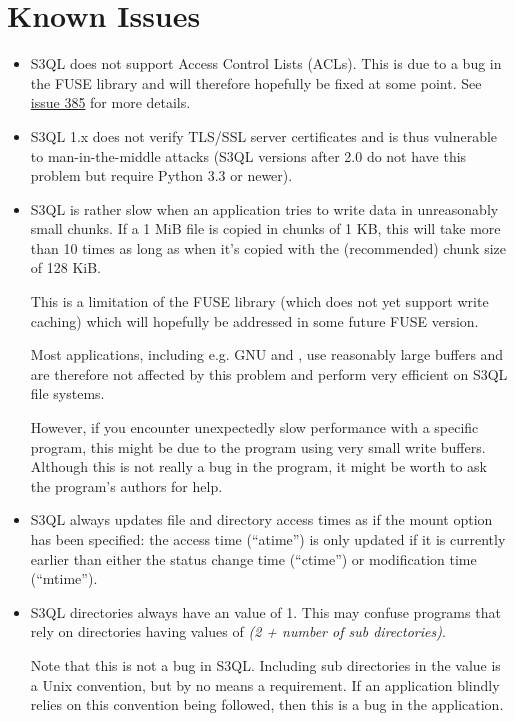\documentclass[letterpaper,10pt,english]{sphinxmanual}
\begin{document}
\chapter{Known Issues}
\label{issues:known-issues}\label{issues::doc}\begin{itemize}
\item {} 
S3QL does not support Access Control Lists (ACLs). This is due to
a bug in the FUSE library and will therefore hopefully be fixed
at some point. See \href{http://code.google.com/p/s3ql/issues/detail?id=385}{issue 385}
for more details.

\item {} 
S3QL 1.x does not verify TLS/SSL server certificates and is thus
vulnerable to man-in-the-middle attacks (S3QL versions after 2.0
do not have this problem but require Python 3.3 or newer).

\item {} 
S3QL is rather slow when an application tries to write data in
unreasonably small chunks. If a 1 MiB file is copied in chunks of 1
KB, this will take more than 10 times as long as when it's copied
with the (recommended) chunk size of 128 KiB.

This is a limitation of the FUSE library (which does not yet support
write caching) which will hopefully be addressed in some future FUSE
version.

Most applications, including e.g. GNU  and , use
reasonably large buffers and are therefore not affected by this
problem and perform very efficient on S3QL file systems.

However, if you encounter unexpectedly slow performance with a
specific program, this might be due to the program using very small
write buffers. Although this is not really a bug in the program,
it might be worth to ask the program's authors for help.

\item {} 
S3QL always updates file and directory access times as if the 
mount option has been specified: the access time (``atime'') is only updated
if it is currently earlier than either the status change time
(``ctime'') or modification time (``mtime'').

\item {} 
S3QL directories always have an  value of 1. This may confuse
programs that rely on directories having  values of \emph{(2 +
number of sub directories)}.

Note that this is not a bug in S3QL. Including sub directories in
the  value is a Unix convention, but by no means a
requirement. If an application blindly relies on this convention
being followed, then this is a bug in the application.


\end{itemize}
\end{document}
